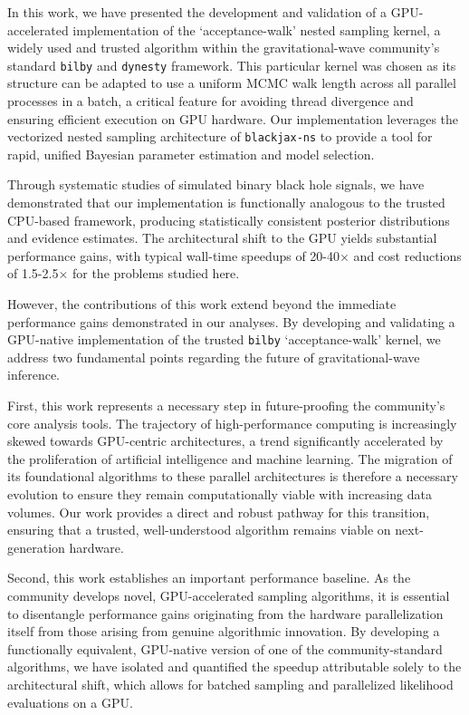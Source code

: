 \documentclass[fleqn,usenatbib]{mnras}
\begin{document}
In this work, we have presented the development and validation of a
GPU-accelerated implementation of the `acceptance-walk' nested sampling
kernel, a widely used and trusted algorithm within the gravitational-wave
community's standard \texttt{bilby} and \texttt{dynesty} framework. This
particular kernel was chosen as its structure can be adapted to use a
uniform MCMC walk length across all parallel processes in a batch, a
critical feature for avoiding thread divergence and ensuring efficient
execution on GPU hardware. Our implementation leverages the vectorized
nested sampling architecture of \texttt{blackjax-ns} to provide a tool
for rapid, unified Bayesian parameter estimation and model selection.

Through systematic studies of simulated binary black hole signals, we have demonstrated
that our implementation is functionally analogous to the trusted
CPU-based framework, producing statistically consistent posterior
distributions and evidence estimates. The architectural shift to the
GPU yields substantial performance gains, with typical wall-time
speedups of 20-40$\times$ and cost reductions of 1.5-2.5$\times$ for the problems studied here.

However, the contributions of this work extend beyond the immediate performance
gains demonstrated in our analyses. By developing and validating a
GPU-native implementation of the trusted \texttt{bilby} `acceptance-walk'
kernel, we address two fundamental points regarding the future of
gravitational-wave inference.

First, this work represents a necessary step in future-proofing the
community's core analysis tools. The trajectory of high-performance
computing is increasingly skewed towards GPU-centric architectures, a
trend significantly accelerated by the proliferation of artificial
intelligence and machine learning. The migration of its foundational algorithms to these parallel
architectures is therefore a necessary evolution to ensure they remain
computationally viable with increasing data volumes. Our work provides a direct
and robust pathway for this transition, ensuring that a trusted,
well-understood algorithm remains viable on next-generation hardware.

Second, this work establishes an important
performance baseline. As the community develops novel, GPU-accelerated
sampling algorithms, it is essential to disentangle performance gains
originating from the hardware parallelization itself from those arising
from genuine algorithmic innovation. By developing a functionally
equivalent, GPU-native version of one of the community-standard 
algorithms, we have isolated and quantified the speedup attributable
solely to the architectural shift, which allows for batched sampling and
parallelized likelihood evaluations on a GPU.
\end{document}
